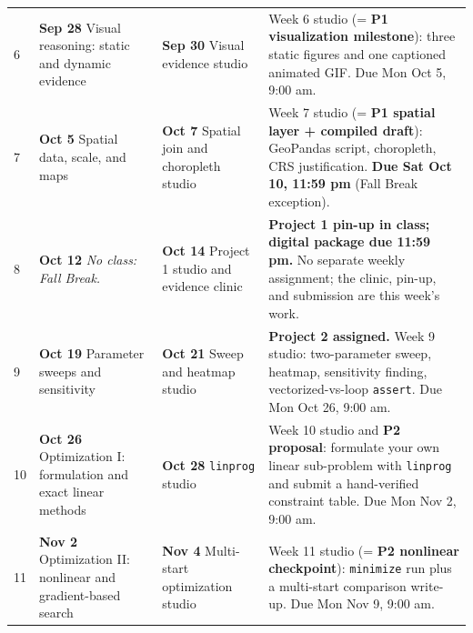 \documentclass[11pt]{article}
\begin{document}
\begin{longtable}{@{}K J J Q@{}}
6 & \textbf{Sep 28} \newline Visual reasoning: static and dynamic evidence
  & \textbf{Sep 30} \newline Visual evidence studio
  & Week 6 studio (= \textbf{P1 visualization milestone}): three static figures and one
    captioned animated GIF. Due Mon Oct 5, 9:00 am. \\

7 & \textbf{Oct 5} \newline Spatial data, scale, and maps
  & \textbf{Oct 7} \newline Spatial join and choropleth studio
  & Week 7 studio (= \textbf{P1 spatial layer + compiled draft}): GeoPandas script,
    choropleth, CRS justification. \textbf{Due Sat Oct 10, 11:59 pm} (Fall Break
    exception). \\

8 & \textbf{Oct 12} \newline \textit{No class: Fall Break.}
  & \textbf{Oct 14} \newline Project 1 studio and evidence clinic
  & \textbf{Project 1 pin-up in class; digital package due 11:59 pm.} No separate weekly
    assignment; the clinic, pin-up, and submission are this week's work. \\

9 & \textbf{Oct 19} \newline Parameter sweeps and sensitivity
  & \textbf{Oct 21} \newline Sweep and heatmap studio
  & \textbf{Project 2 assigned.} Week 9 studio: two-parameter sweep, heatmap, sensitivity
    finding, vectorized-vs-loop \texttt{assert}. Due Mon Oct 26, 9:00 am. \\

10 & \textbf{Oct 26} \newline Optimization I: formulation and exact linear methods
  & \textbf{Oct 28} \newline \texttt{linprog} studio
  & Week 10 studio and \textbf{P2 proposal}: formulate your own linear sub-problem with
    \texttt{linprog} and submit a hand-verified constraint table.
    Due Mon Nov 2, 9:00 am. \\

11 & \textbf{Nov 2} \newline Optimization II: nonlinear and gradient-based search
  & \textbf{Nov 4} \newline Multi-start optimization studio
  & Week 11 studio (= \textbf{P2 nonlinear checkpoint}): \texttt{minimize} run plus a
    multi-start comparison write-up. Due Mon Nov 9, 9:00 am. \\


\end{longtable}
\end{document}
